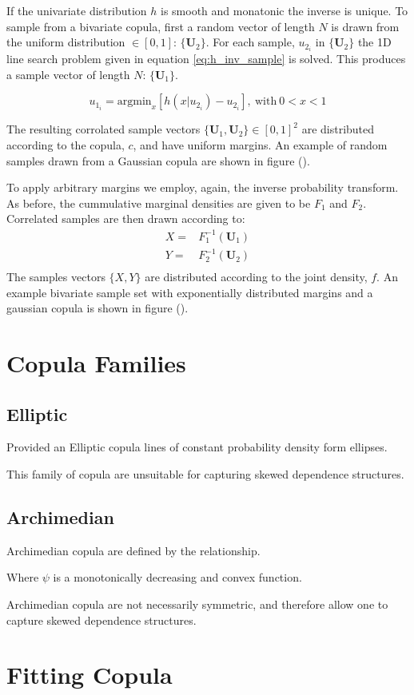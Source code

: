 If the univariate distribution $h$ is smooth and monatonic the inverse is unique.
To sample from a bivariate copula, first a random vector of length $N$ is drawn from the uniform distribution $\in [0, 1]$:  $\{\mathbf U_2\}$.  For each sample, $u_{2_i}$ in $\{\mathbf U_2\}$ the 1D line search problem given in equation \ref{eq:h_inv_sample} is solved.  This produces a sample vector of length $N$: $\{\mathbf U_1\}$.

\begin{equation}
u_{1_i} = \mathrm{argmin}_{x} \left[ h(x|u_{2_i}) - u_{2_i} \right],\ \mathrm{with}\ 0 < x < 1
\label{eq:h_inv_sample}
\end{equation}

The resulting corrolated sample vectors $\{\mathbf U_1, \mathbf U_2\} \in [0,1]^2$ are distributed according to the copula, $c$, and have uniform margins.  An example of random samples drawn from a Gaussian copula are shown in figure ().

To apply arbitrary margins we employ, again, the inverse probability transform.  As before, the cummulative marginal densities are given to be $F_1$ and $F_2$.
Correlated samples are then drawn according to:
\begin{eqnarray}
X = & F_1^{-1}(\mathbf U_1) \\
Y = & F_2^{-1}(\mathbf U_2) \\
\end{eqnarray}
The samples vectors $\{X, Y\}$ are distributed according to the joint density, $f$.  An example bivariate sample set with exponentially distributed margins and a gaussian copula is shown in figure ().

\section*{Copula Families}

\subsection*{Elliptic}

Provided an Elliptic copula lines of constant probability density form ellipses.

This family of copula are unsuitable for capturing skewed dependence structures.

\subsection*{Archimedian}

Archimedian copula are defined by the relationship.

Where $\psi$ is a monotonically decreasing and convex function.

Archimedian copula are not necessarily symmetric, and therefore allow one to capture
skewed dependence structures.

\section*{Fitting Copula}